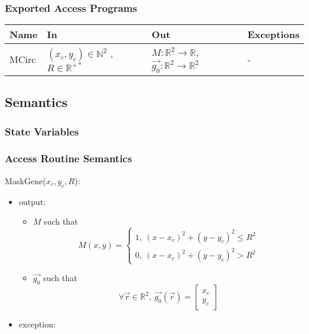\documentclass[12pt, titlepage]{article}
\begin{document}
\subsubsection{Exported Access Programs}

\begin{center}
\begin{tabular}{p{2cm} p{4cm} p{4cm} p{2cm}}
\hline
\textbf{Name} & \textbf{In} & \textbf{Out} & \textbf{Exceptions} \\
\hline
MCirc & $(x_c,y_c) \in \mathbb{N}^2$ , $R \in \mathbb{R}^{+*}$ & $M:\mathbb{R}^2\rightarrow\mathbb{R}$, $\overrightarrow{g_0} :\mathbb{R}^2\rightarrow\mathbb{R}^2$ & - \\
\hline
\end{tabular}
\end{center}

\subsection{Semantics}

\subsubsection{State Variables}


\subsubsection{Access Routine Semantics}

\noindent MaskGene($x_c,y_c,R$):
\begin{itemize} 
\item output: 
	\begin{itemize}
	\item $M$ such that
	\begin{equation*}
	M(x,y)=\begin{cases}
	1, \ (x-x_c)^2+(y-y_c)^2\leq R^2 \\
	0, \ (x-x_c)^2+(y-y_c)^2> R^2
	\end{cases}
	\end{equation*}
	\item $\overrightarrow{g_0}$ such that
	\begin{equation*}
	\forall \vec{r} \in \mathbb{R}^2, \ \overrightarrow{g_0}(\vec{r})=\begin{bmatrix}
	x_c\\
	y_c
	\end{bmatrix}
	\end{equation*}
	\end{itemize}
\item exception:  
\end{itemize}
\end{document}

